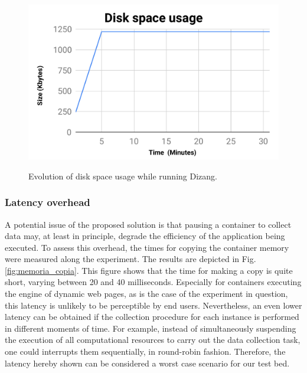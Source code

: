\documentclass[10pt,journal,compsoc]{IEEEtran}
\newcommand{\marcos}[1]{{\color{green}{MARCOS: #1}}}
\newcommand{\fancyname}{Dizang}
\begin{document}
\begin{figure}[htb!]
\footnotesize
\caption{Evolution of disk space usage while running \fancyname. 
}
\includegraphics[center,scale=0.40]{evolucao_coleta_ieee.pdf}
\centering
\label{fig:evolucao_coleta}
\end{figure}


\subsubsection{Latency overhead}
A potential issue of the proposed solution is that pausing a container to collect data may, at least in principle, degrade the efficiency of the application being executed.
%
To assess this overhead, the times for copying the container memory were measured along the experiment.
%
The results are depicted in Fig. \ref{fig:memoria_copia}.
%
This figure shows that the time for making a copy is quite short, varying between 20 and 40 milliseconds. 
%
Especially for containers executing the engine of dynamic web pages, as is the case of the experiment in question, this latency is unlikely to be perceptible by end users.
%
Nevertheless, an even lower latency can be obtained if the collection procedure for each instance is performed in different moments of time.
%
For example, instead of simultaneously suspending the execution of all computational resources to carry out the data collection task, one could interrupts them sequentially, in round-robin fashion.
%
Therefore, the latency hereby shown can be considered a worst case scenario for our test bed.
\end{document}
